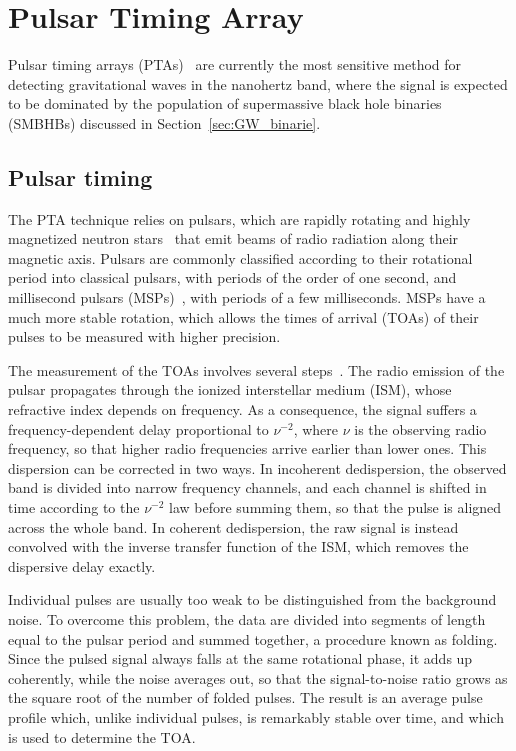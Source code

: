 \chapter{Pulsar Timing Array} \label{chpt:PTA}

Pulsar timing arrays (PTAs)~\cite{Sazhin1978, Detweiler1979, FosterBacker1990} are currently the most sensitive method for detecting
gravitational waves in the nanohertz band, where the signal is expected to be
dominated by the population of supermassive black hole binaries (SMBHBs) discussed
in Section~\ref{sec:GW_binarie}.

\section{Pulsar timing} \label{sec:timing}

The PTA technique relies on pulsars, which are rapidly
rotating and highly magnetized neutron stars~\cite{Hewish1968} that emit beams of radio radiation along
their magnetic axis. Pulsars are commonly classified according to their rotational
period into classical pulsars, with periods of the order of one second, and
millisecond pulsars (MSPs)~\cite{Backer1982}, with periods of a few milliseconds. MSPs have a much more stable rotation, which allows the
times of arrival (TOAs) of their pulses to be measured with higher precision.

The measurement of the TOAs involves several steps~\cite{LorimerKramer2005, Taylor2021}. The radio emission of the
pulsar propagates through the ionized interstellar medium (ISM), whose refractive
index depends on frequency. As a consequence, the signal suffers a
frequency-dependent delay proportional to $\nu^{-2}$, where $\nu$ is the observing
radio frequency, so that higher radio frequencies arrive earlier than
lower ones.
This dispersion can be corrected in two ways. In incoherent dedispersion, the
observed band is divided into narrow frequency channels, and each channel is
shifted in time according to the $\nu^{-2}$ law before summing them, so that the
pulse is aligned across the whole band. In coherent dedispersion, the raw signal
is instead convolved with the inverse transfer function of the ISM, which removes
the dispersive delay exactly.

Individual pulses are usually too weak to be distinguished from the background
noise. To overcome this problem, the data are divided into segments of length
equal to the pulsar period and summed together, a procedure known as folding.
Since the pulsed signal always falls at the same rotational phase, it adds up
coherently, while the noise averages out, so that the signal-to-noise ratio grows
as the square root of the number of folded pulses. The result is an average pulse
profile which, unlike individual pulses, is remarkably stable over time, and which
is used to determine the TOA.

